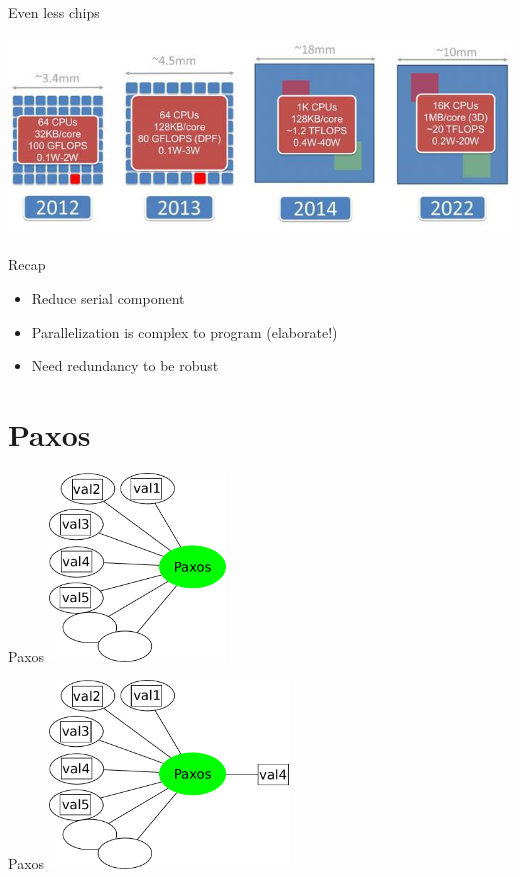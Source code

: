 \documentclass[14pt]{beamer}
\begin{document}
\begin{frame}{Even less chips}
    \begin{center}
        \includegraphics[width=\textheight]{images/parallella_future.jpg}
    \end{center}
\end{frame}

\begin{frame}{Recap}
    \begin{itemize}
        \item Reduce serial component
        \item Parallelization is complex to program (elaborate!)
            \pause
        \item Need redundancy to be robust
    \end{itemize}
\end{frame}

\section{Paxos}

\begin{frame}{Paxos}
    \pause
    \vspace{0.35cm}
    \hskip0.6cm
    \includegraphics[height=5cm]{images/paxos1.pdf}
\end{frame}

\begin{frame}{Paxos}
    \vspace{0.35cm}
    \hskip0.6cm
    \includegraphics[height=5cm]{images/paxos2.pdf}
\end{frame}
\end{document}
